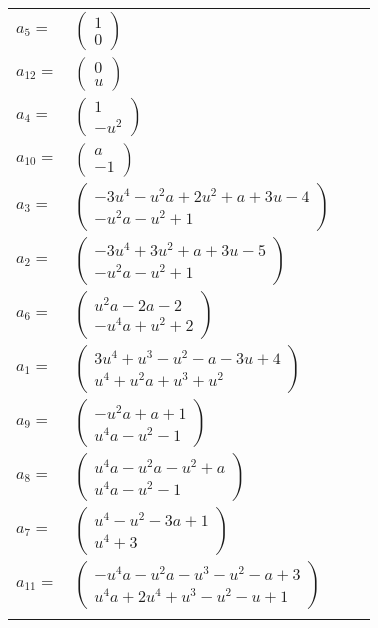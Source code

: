 \documentclass[1p]{elsarticle_modified}
\theoremstyle{definition}
\begin{document}
\begin{tabular}{m{7pt} m{180pt} m{7pt} m{180pt} }
\flushright $a_{5}=$&$\begin{pmatrix}1\\0\end{pmatrix}$ \\
\flushright $a_{12}=$&$\begin{pmatrix}0\\u\end{pmatrix}$ \\
\flushright $a_{4}=$&$\begin{pmatrix}1\\- u^2\end{pmatrix}$ \\
\flushright $a_{10}=$&$\begin{pmatrix}a\\-1\end{pmatrix}$ \\
\flushright $a_{3}=$&$\begin{pmatrix}-3 u^4- u^2 a+2 u^2+a+3 u-4\\- u^2 a- u^2+1\end{pmatrix}$ \\
\flushright $a_{2}=$&$\begin{pmatrix}-3 u^4+3 u^2+a+3 u-5\\- u^2 a- u^2+1\end{pmatrix}$ \\
\flushright $a_{6}=$&$\begin{pmatrix}u^2 a-2 a-2\\- u^4 a+u^2+2\end{pmatrix}$ \\
\flushright $a_{1}=$&$\begin{pmatrix}3 u^4+u^3- u^2- a-3 u+4\\u^4+u^2 a+u^3+u^2\end{pmatrix}$ \\
\flushright $a_{9}=$&$\begin{pmatrix}- u^2 a+a+1\\u^4 a- u^2-1\end{pmatrix}$ \\
\flushright $a_{8}=$&$\begin{pmatrix}u^4 a- u^2 a- u^2+a\\u^4 a- u^2-1\end{pmatrix}$ \\
\flushright $a_{7}=$&$\begin{pmatrix}u^4- u^2-3 a+1\\u^4+3\end{pmatrix}$ \\
\flushright $a_{11}=$&$\begin{pmatrix}- u^4 a- u^2 a- u^3- u^2- a+3\\u^4 a+2 u^4+u^3- u^2- u+1\end{pmatrix}$\\&\end{tabular}
\end{document}
